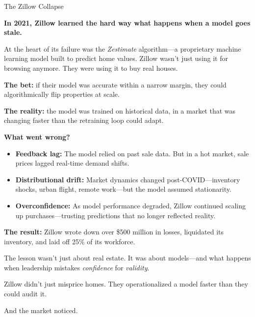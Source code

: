 \medskip

\begin{HistoricalSidebar}{The Zillow Collapse}

  \textbf{In 2021, Zillow learned the hard way what happens when a model goes stale.}

  \medskip
  
  At the heart of its failure was the \textit{Zestimate} algorithm—a proprietary machine learning 
  model built to 
  predict home values.  
  Zillow wasn't just using it for browsing anymore. They were using it to buy real houses.
  
  \medskip
  
  \textbf{The bet:} if their model was accurate within a narrow margin, they could algorithmically 
  flip properties at scale.  

  \medskip

  \textbf{The reality:} the model was trained on historical data, in a market that was changing 
  faster than the 
  retraining loop could adapt.
  
  \medskip
  
  \textbf{What went wrong?}

  \medskip
  
  \begin{itemize}
    \item \textbf{Feedback lag:} The model relied on past sale data. But in a hot market, sale prices 
    lagged real-time 
    demand shifts.
    \item \textbf{Distributional drift:} Market dynamics changed post-COVID—inventory shocks, urban 
    flight, remote 
    work—but the model assumed stationarity.
    \item \textbf{Overconfidence:} As model performance degraded, Zillow continued scaling up 
    purchases—trusting 
    predictions that no longer reflected reality.
  \end{itemize}

  \medskip
  
  \textbf{The result:}  Zillow wrote down over \$500 million in losses, liquidated its inventory, and 
  laid off 25\% of 
  its workforce.
  
  \medskip
  
  The lesson wasn’t just about real estate.  
  It was about models—and what happens when leadership mistakes \textit{confidence} for \textit{validity}.
  
  Zillow didn’t just misprice homes.  
  They operationalized a model faster than they could audit it.
  
  And the market noticed.
  
\end{HistoricalSidebar}

